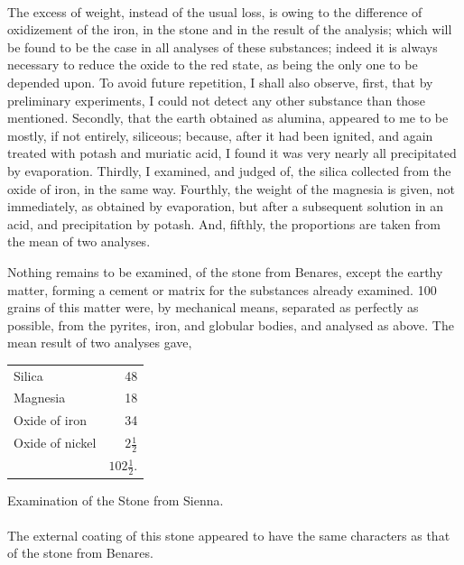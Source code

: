 \documentclass[a4paper, 12pt, oneside, twocolumn]{article}
\begin{document}
\paragraph{}
The excess of weight, instead of the usual loss, is owing to the difference of oxidizement of the iron, in the stone and in the result of the analysis; which will be found to be the case in all analyses of these substances; indeed it is always necessary to reduce the oxide to the red state, as being the only one to be depended upon. To avoid future repetition, I shall also observe, first, that by preliminary experiments, I could not detect any other substance than those mentioned. Secondly, that the earth obtained as alumina, appeared to me to be mostly, if not entirely, siliceous; because, after it had been ignited, and again treated with potash and muriatic acid, I found it was very nearly all precipitated by evaporation. Thirdly, I examined, and judged of, the silica collected from the oxide of iron, in the same way. Fourthly, the weight of the magnesia is given, not immediately, as obtained by evaporation, but after a subsequent solution in an acid, and precipitation by potash. And, fifthly, the proportions are taken from the mean of two analyses.

Nothing remains to be examined, of the stone from Benares, except the earthy matter, forming a cement or matrix for the substances already examined. 100 grains of this matter were, by mechanical means, separated as perfectly as possible, from the pyrites, iron, and globular bodies, and analysed as above. The mean result of two analyses gave,
\begin{table}[H]
    \centering\bfseries
    \begin{tabular}{l r}
        Silica & 48 \\ 
        Magnesia & 18 \\ 
        Oxide of iron & 34 \\ 
        Oxide of nickel & $2\frac{1}{2}$   \\ \hline
        ~ & $102\frac{1}{2}$. \\
    \end{tabular}
\end{table}
\begin{center}
Examination of the Stone from Sienna.
\end{center}
\paragraph{}
The external coating of this stone appeared to have the same characters as that of the stone from Benares.
\end{document}
